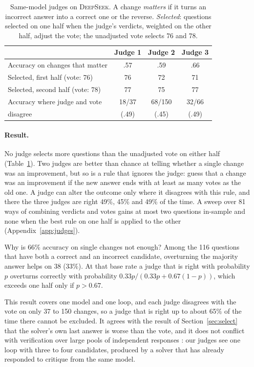 \documentclass[11pt]{article}
\newcommand{\ds}{\textsc{DeepSeek}}
\begin{document}
\begin{table}[t]
\centering
\small
\setlength{\tabcolsep}{3.5pt}
\begin{tabular}{@{}l ccc@{}}
\toprule
 & Judge 1 & Judge 2 & Judge 3 \\
\midrule
Accuracy on changes that matter & .57 & .59 & .66 \\
Selected, first half (vote: 76) & 76 & 72 & 71 \\
Selected, second half (vote: 78) & 77 & 75 & 77 \\
Accuracy where judge and vote & 18/37 & 68/150 & 32/66 \\
\quad disagree & (.49) & (.45) & (.49) \\
\bottomrule
\end{tabular}
\caption{Same-model judges on \ds. A change \emph{matters} if it turns an incorrect answer into a correct one or the reverse. \emph{Selected}: questions selected on one half when the judge's verdicts, weighted on the other half, adjust the vote; the unadjusted vote selects 76 and 78.}
\label{tab:judges}
\end{table}

\paragraph{Result.}
No judge selects more questions than the unadjusted vote on either half (Table~\ref{tab:judges}).
Two judges are better than chance at telling whether a single change was an improvement, but so is a rule that ignores the judge: guess that a change was an improvement if the new answer ends with at least as many votes as the old one.
A judge can alter the outcome only where it disagrees with this rule, and there the three judges are right 49\%, 45\% and 49\% of the time.
A sweep over 81 ways of combining verdicts and votes gains at most two questions in-sample and none when the best rule on one half is applied to the other (Appendix~\ref{app:judges}).

Why is 66\% accuracy on single changes not enough?
Among the 116 questions that have both a correct and an incorrect candidate, overturning the majority answer helps on 38 (33\%).
At that base rate a judge that is right with probability $p$ overturns correctly with probability $0.33p/(0.33p+0.67(1-p))$, which exceeds one half only if $p>0.67$.

This result covers one model and one loop, and each judge disagrees with the vote on only 37 to 150 changes, so a judge that is right up to about 65\% of the time there cannot be excluded.
It agrees with the result of Section~\ref{sec:select} that the solver's own last answer is worse than the vote, and it does not conflict with verification over large pools of independent responses \citep{zhao2025sample}: our judges see one loop with three to four candidates, produced by a solver that has already responded to critique from the same model.
\end{document}
